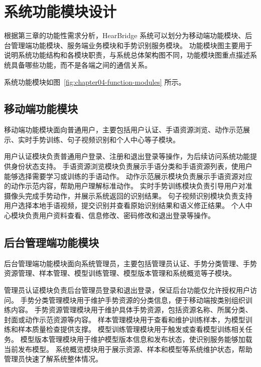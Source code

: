 
\section{系统功能模块设计}

根据第三章的功能性需求分析，HearBridge 系统可以划分为移动端功能模块、后台管理端功能模块、服务端业务模块和手势识别服务模块。
功能模块图主要用于说明系统功能结构和各模块职责，与系统总体架构图不同，功能模块图重点描述系统具备哪些功能，而不是各端之间的通信关系。

系统功能模块如图~\ref{fig:chapter04-function-modules} 所示。


\subsection{移动端功能模块}

移动端功能模块面向普通用户，主要包括用户认证、手语资源浏览、动作示范展示、实时手势训练、句子视频识别和个人中心等子模块。

用户认证模块负责普通用户登录、注册和退出登录等操作，为后续访问系统功能提供身份状态支持。
手语资源浏览模块负责展示手语分类和手语资源列表，使用户能够选择需要学习或训练的手语动作。
动作示范展示模块负责展示手语资源对应的动作示范内容，帮助用户理解标准动作。
实时手势训练模块负责引导用户对准摄像头完成手势动作，并展示系统返回的识别结果。
句子视频识别模块负责支持用户选择本地手语视频，提交识别并查看原始识别结果和语义修正结果。
个人中心模块负责用户资料查看、信息修改、密码修改和退出登录等操作。

\subsection{后台管理端功能模块}

后台管理端功能模块面向系统管理员，主要包括管理员认证、手势分类管理、手势资源管理、样本管理、模型训练管理、模型版本管理和系统概览等子模块。

管理员认证模块负责后台管理员登录和退出登录，保证后台功能仅允许授权用户访问。
手势分类管理模块用于维护手势资源的分类信息，便于移动端按类别组织训练内容。
手势资源管理模块用于维护具体手势资源，包括资源名称、所属分类、封面或动作示范资源等内容。
样本管理模块用于查看和维护训练样本，为模型训练和样本质量检查提供支撑。
模型训练管理模块用于触发或查看模型训练相关任务。
模型版本管理模块用于维护模型版本信息和发布状态，使识别服务能够加载当前发布模型。
系统概览模块用于展示资源、样本和模型等系统维护状态，帮助管理员快速了解系统整体情况。

